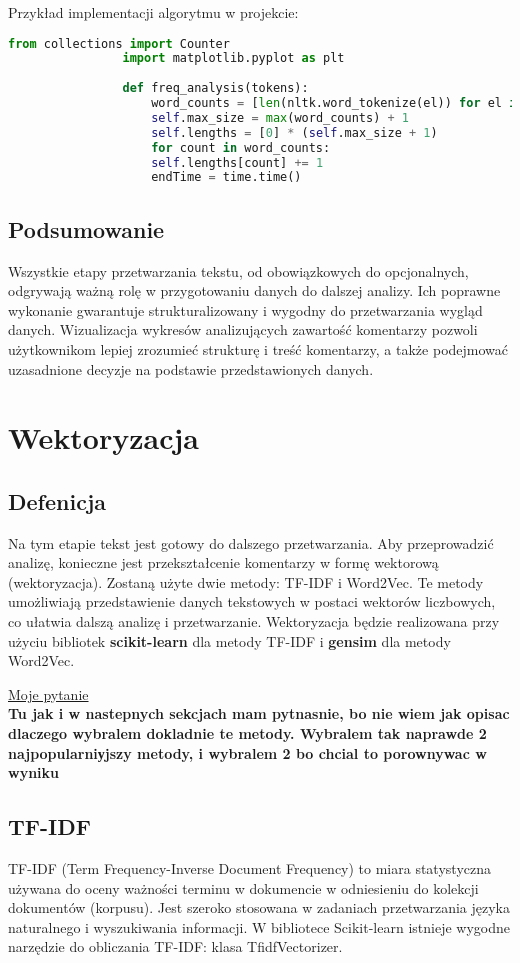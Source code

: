 			Przykład implementacji algorytmu w projekcie:
			\begin{lstlisting}[language=Python]
				from collections import Counter
				import matplotlib.pyplot as plt
				
				def freq_analysis(tokens):
					word_counts = [len(nltk.word_tokenize(el)) for el in self.nlp_data]
					self.max_size = max(word_counts) + 1
					self.lengths = [0] * (self.max_size + 1)
					for count in word_counts:
					self.lengths[count] += 1
					endTime = time.time()
			\end{lstlisting}
	
	\subsection{Podsumowanie}
		Wszystkie etapy przetwarzania tekstu, od obowiązkowych do opcjonalnych, odgrywają ważną rolę w przygotowaniu danych do dalszej analizy. Ich poprawne wykonanie gwarantuje strukturalizowany i wygodny do przetwarzania wygląd danych. Wizualizacja wykresów analizujących zawartość komentarzy pozwoli użytkownikom lepiej zrozumieć strukturę i treść komentarzy, a także podejmować uzasadnione decyzje na podstawie przedstawionych danych.
	
	
\section{Wektoryzacja}
	
	\subsection{Defenicja}
		Na tym etapie tekst jest gotowy do dalszego przetwarzania. Aby przeprowadzić analizę, konieczne jest przekształcenie komentarzy w formę wektorową (wektoryzacja). Zostaną użyte dwie metody: TF-IDF i Word2Vec. Te metody umożliwiają przedstawienie danych tekstowych w postaci wektorów liczbowych, co ułatwia dalszą analizę i przetwarzanie. Wektoryzacja będzie realizowana przy użyciu bibliotek \textbf{scikit-learn} \cite{scikit-learn} dla metody TF-IDF i \textbf{gensim} \cite{gensim} dla metody Word2Vec. 

		\underline{Moje pytanie}\\
		\textbf{Tu jak i w nastepnych sekcjach mam pytnasnie, bo nie wiem jak opisac dlaczego wybralem dokladnie te metody. Wybralem tak naprawde 2 najpopularniуjszy metody, i wybralem 2 bo chcial to porownywac w wyniku}

	
	\subsection{TF-IDF}
 		TF-IDF (Term Frequency-Inverse Document Frequency) to miara statystyczna używana do oceny ważności terminu w dokumencie w odniesieniu do kolekcji dokumentów (korpusu). Jest szeroko stosowana w zadaniach przetwarzania języka naturalnego i wyszukiwania informacji. W bibliotece Scikit-learn istnieje wygodne narzędzie do obliczania TF-IDF: klasa TfidfVectorizer. \cite{tf-idf}
		
